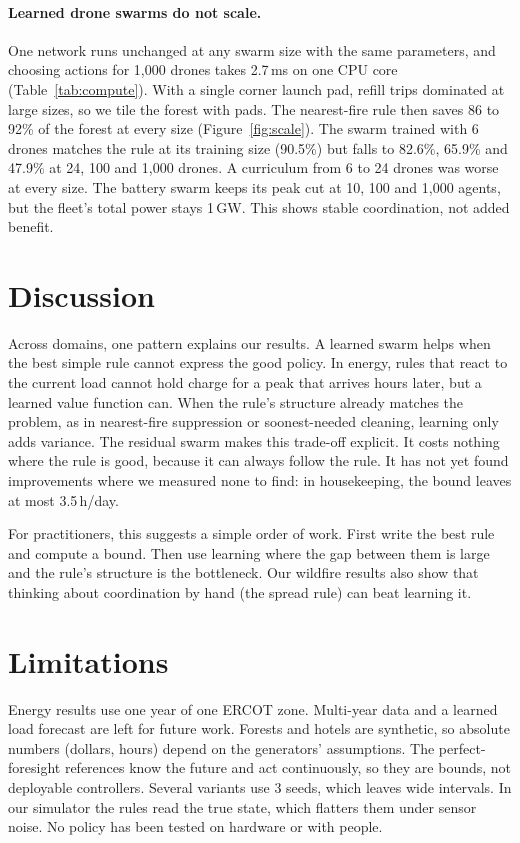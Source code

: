 \documentclass[11pt]{article}
\begin{document}


\paragraph{Learned drone swarms do not scale.} One network runs unchanged at any swarm size with the same parameters, and choosing actions for 1{,}000 drones takes 2.7\,ms on one CPU core (Table~\ref{tab:compute}). With a single corner launch pad, refill trips dominated at large sizes, so we tile the forest with pads. The nearest-fire rule then saves 86 to 92\% of the forest at every size (Figure~\ref{fig:scale}). The swarm trained with 6 drones matches the rule at its training size (90.5\%) but falls to 82.6\%, 65.9\% and 47.9\% at 24, 100 and 1{,}000 drones. A curriculum from 6 to 24 drones was worse at every size. The battery swarm keeps its peak cut at 10, 100 and 1{,}000 agents, but the fleet's total power stays 1\,GW. This shows stable coordination, not added benefit.

\section{Discussion}

Across domains, one pattern explains our results. A learned swarm helps when the best simple rule cannot express the good policy. In energy, rules that react to the current load cannot hold charge for a peak that arrives hours later, but a learned value function can. When the rule's structure already matches the problem, as in nearest-fire suppression or soonest-needed cleaning, learning only adds variance. The residual swarm makes this trade-off explicit. It costs nothing where the rule is good, because it can always follow the rule. It has not yet found improvements where we measured none to find: in housekeeping, the bound leaves at most 3.5\,h/day.

For practitioners, this suggests a simple order of work. First write the best rule and compute a bound. Then use learning where the gap between them is large and the rule's structure is the bottleneck. Our wildfire results also show that thinking about coordination by hand (the spread rule) can beat learning it.

\section{Limitations}
Energy results use one year of one ERCOT zone. Multi-year data and a learned load forecast are left for future work. Forests and hotels are synthetic, so absolute numbers (dollars, hours) depend on the generators' assumptions. The perfect-foresight references know the future and act continuously, so they are bounds, not deployable controllers. Several variants use 3 seeds, which leaves wide intervals. In our simulator the rules read the true state, which flatters them under sensor noise. No policy has been tested on hardware or with people.
\end{document}
